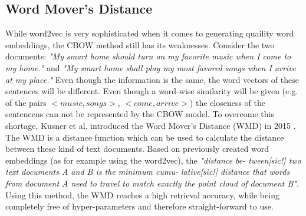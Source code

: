 \subsection{Word Mover's Distance} %
\label{sub:word_movers_distance}
While word2vec is very sophisticated when it comes to generating quaility word embeddings, the CBOW method still has its weaknesses. Consider the two documents: \emph{"My smart home should turn on my favorite music when I come to my home."} and \emph{"My smart home shall play my most favored songs when I arrive at my place."} Even though the information is the same, the word vectors of these sentences will be different. Even though a word-wise similarity will be given (e.g. of the pairs $< music, songs>$, $<come, arrive>$) the closeness of the sentencens can not be represented by the CBOW model. To overcome this shortage, Kusner et al. introduced the Word Mover's Distance (WMD) in 2015 \cite{kusner_word_2015}. The WMD is a distance function which can be used to calculate the distance between these kind of text documents. Based on previously created word embeddings (as for example using the word2vec), the \textit{"distance be- tween[sic!] two text documents A and B is the minimum cumu- lative[sic!] distance that words from document A need to travel to match exactly the point cloud of document B"}\cite[p2]{kusner_word_2015}. Using this method, the WMD reaches a high retrieval accuracy, while being completely free of hyper-parameters and therefore straight-forward to use.